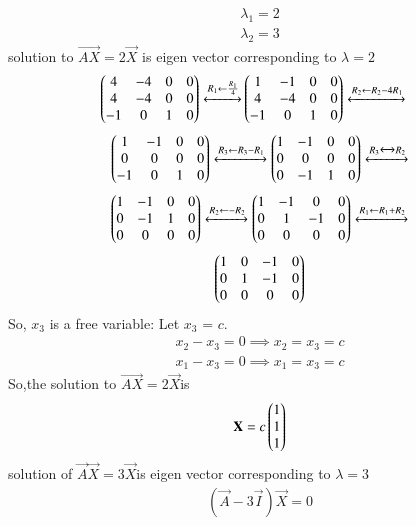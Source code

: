 \documentclass[journal,12pt,twocolumn]{IEEEtran}
\begin{document}
\begin{flushleft}
\begin{align}
 \lambda_1=2\\
 \lambda_2=3
 \end{align}
solution to $\vec{AX} =2\vec{X}$ is eigen vector corresponding to $\lambda=2$
\begin{align}
\begin{pmatrix}4& -4&0&0\\
4 & -4 & 0&0\\
-1 & 0 &1&0
\end{pmatrix}
\xleftrightarrow[]{R_1 \leftarrow \frac{R_1}{4}} 
&
\begin{pmatrix}1&-1&0&0\\
4&-4&0&0\\
-1&0&1&0\end{pmatrix}
\xleftrightarrow[]{R_2 \leftarrow R_2-4R_1 } \nonumber 
\end{align}
\begin{align}
    \begin{pmatrix}1&-1&0&0\\
            0&0&0&0\\
            -1&0&1&0\end{pmatrix}
    \xleftrightarrow[]{R_3 \leftarrow R_3-R_1 }
    \begin{pmatrix}1&-1&0&0\\
            0&0&0&0\\
            0&-1&1&0\end{pmatrix}
    \xleftrightarrow[]{R_3 \xleftrightarrow[]{} R_2 } \nonumber
\end{align}
\begin{align}
    \begin{pmatrix}1&-1&0&0\\
    0&-1&1&0\\
    0&0&0&0\end{pmatrix}
    \xleftrightarrow[]{R_2 \leftarrow -R_2} 
    \begin{pmatrix}1&-1&0&0\\
    0&1&-1&0\\
    0&0&0&0\end{pmatrix}   
    \xleftrightarrow[]{R_1 \leftarrow R_1+R_2} \nonumber
\end{align}
\begin{align} \label{eq:eq_5}
    \begin{pmatrix}1&0&-1&0\\
    0&1&-1&0\\
    0&0&0&0\end{pmatrix} 
\end{align}
So, $x_3$ is a free variable: Let $x_3$ = $c$. 
\begin{align}
 {x_2}-{x_3}=0 \implies{x_2}={x_3}=c \\
 {x_1}-{x_3}=0 \implies{x_1}={x_3}=c 
 \end{align}
 So,the solution to $\vec{AX} =2\vec{X}$is
 \begin{align}\label{eq:555}
 \mathbf{X} = 
 c
 \begin{pmatrix}
 1\\1\\1
 \end{pmatrix}
\end{align}
 solution of $\vec{A}\vec{X}=3\vec{X}$is eigen vector corresponding to $\lambda=3$ 
 \begin{align}\label{eq11}
(\vec{A}-3\vec{I})\vec X=0

\end{align}
\end{flushleft}
\end{document}
